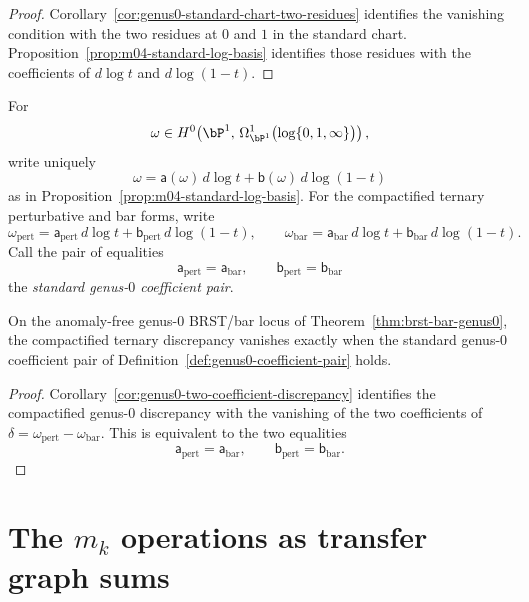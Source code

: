 \begin{proof}
Corollary~\ref{cor:genus0-standard-chart-two-residues} identifies the
vanishing condition with the two residues at $0$ and $1$ in the
standard chart. Proposition~\ref{prop:m04-standard-log-basis}
identifies those residues with the coefficients of \(d\log t\) and
\(d\log(1-t)\).
\end{proof}

\begin{definition}
\label{def:genus0-coefficient-pair}
For
\[
\omega \in H^0\!\left(\bP^1,\,
\Omega^1_{\bP^1}\bigl(\log\{0,1,\infty\}\bigr)\right),
\]
write uniquely
\[
\omega=\mathsf{a}(\omega)\,d\log t+\mathsf{b}(\omega)\,d\log(1-t)
\]
as in Proposition~\ref{prop:m04-standard-log-basis}. For the
compactified ternary perturbative and bar forms, write
\[
\omega_{\mathrm{pert}}
= \mathsf{a}_{\mathrm{pert}}\,d\log t
 + \mathsf{b}_{\mathrm{pert}}\,d\log(1-t),
\qquad
\omega_{\mathrm{bar}}
= \mathsf{a}_{\mathrm{bar}}\,d\log t
 + \mathsf{b}_{\mathrm{bar}}\,d\log(1-t).
\]
Call the pair of equalities
\[
\mathsf{a}_{\mathrm{pert}}=\mathsf{a}_{\mathrm{bar}},
\qquad
\mathsf{b}_{\mathrm{pert}}=\mathsf{b}_{\mathrm{bar}}
\]
the \emph{standard genus-$0$ coefficient pair}.
\end{definition}

\begin{corollary}
\label{cor:genus0-named-coefficient-discrepancy}
On the anomaly-free genus-$0$ BRST/bar locus of
Theorem~\ref{thm:brst-bar-genus0}, the compactified ternary discrepancy
vanishes exactly when the standard genus-$0$ coefficient pair of
Definition~\ref{def:genus0-coefficient-pair} holds.
\end{corollary}

\begin{proof}
Corollary~\ref{cor:genus0-two-coefficient-discrepancy} identifies the
compactified genus-$0$ discrepancy with the vanishing of the two
coefficients of
\(\delta=\omega_{\mathrm{pert}}-\omega_{\mathrm{bar}}\).
This is equivalent to the two equalities
\[
\mathsf{a}_{\mathrm{pert}}=\mathsf{a}_{\mathrm{bar}},
\qquad
\mathsf{b}_{\mathrm{pert}}=\mathsf{b}_{\mathrm{bar}}.
\]
\end{proof}

\section{\texorpdfstring{The $m_k$ operations as transfer graph sums}{The m k operations as transfer graph sums}}
\label{sec:mk-feynman-complete}

